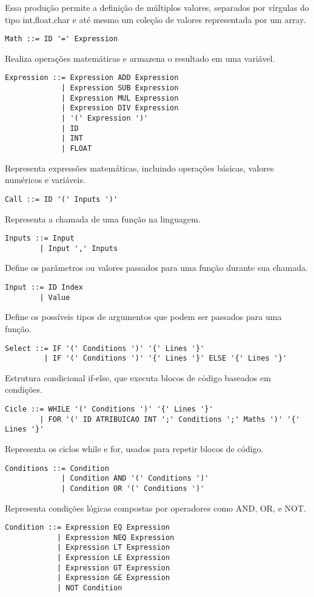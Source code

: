 \documentclass[12pt,a4paper]{report}
\begin{document}
Essa produção permite a definição de múltiplos valores, separados por vírgulas do tipo int,float,char e até mesmo um coleção de valores representada por um array.
\begin{lstlisting}
Math ::= ID '=' Expression
\end{lstlisting}
Realiza operações matemáticas e armazena o resultado em uma variável.
\begin{lstlisting}
Expression ::= Expression ADD Expression
             | Expression SUB Expression
             | Expression MUL Expression
             | Expression DIV Expression
             | '(' Expression ')'
             | ID
             | INT
             | FLOAT
\end{lstlisting}
Representa expressões matemáticas, incluindo operações básicas, valores numéricos e variáveis.
\begin{lstlisting}
Call ::= ID '(' Inputs ')'
\end{lstlisting}
Representa a chamada de uma função na linguagem.
\begin{lstlisting}
Inputs ::= Input
        | Input ',' Inputs
\end{lstlisting}
Define os parâmetros ou valores passados para uma função durante sua chamada.
\begin{lstlisting}
Input ::= ID Index
        | Value
\end{lstlisting}
Define os possíveis tipos de argumentos que podem ser passados para uma função.
\begin{lstlisting}
Select ::= IF '(' Conditions ')' '{' Lines '}'
         | IF '(' Conditions ')' '{' Lines '}' ELSE '{' Lines '}'
\end{lstlisting}
Estrutura condicional if-else, que executa blocos de código baseados em condições.
\begin{lstlisting}
Cicle ::= WHILE '(' Conditions ')' '{' Lines '}'
        | FOR '(' ID ATRIBUICAO INT ';' Conditions ';' Maths ')' '{' Lines '}'
\end{lstlisting}
Representa os ciclos while e for, usados para repetir blocos de código.
\begin{lstlisting}
Conditions ::= Condition
             | Condition AND '(' Conditions ')'
             | Condition OR '(' Conditions ')'
\end{lstlisting}
Representa condições lógicas compostas por operadores como AND, OR, e NOT.
\begin{lstlisting}
Condition ::= Expression EQ Expression
            | Expression NEQ Expression
            | Expression LT Expression
            | Expression LE Expression
            | Expression GT Expression
            | Expression GE Expression
            | NOT Condition
\end{lstlisting}
\end{document}
